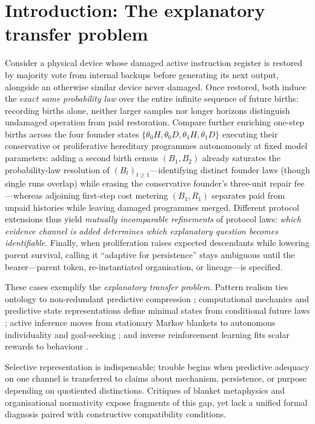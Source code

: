 \documentclass[12pt,letterpaper]{article}
\begin{document}
\section{Introduction: The explanatory transfer
problem}\label{introduction-the-explanatory-transfer-problem}

Consider a physical device whose damaged active instruction register is
restored by majority vote from internal backups before generating its
next output, alongside an otherwise similar device never damaged. Once
restored, both induce the \emph{exact same probability law} over the
entire infinite sequence of future births: recording births alone,
neither larger samples nor longer horizons distinguish undamaged
operation from paid restoration. Compare further enriching one-step
births across the four founder states
\(\{\theta_0 H, \theta_0 D, \theta_1 H, \theta_1 D\}\) executing their
conservative or proliferative hereditary programmes autonomously at
fixed model parameters: adding a second birth census \((B_1, B_2)\)
already saturates the probability-law resolution of
\((B_t)_{t\ge 1}\)---identifying distinct founder laws (though single
runs overlap) while erasing the conservative founder's three-unit repair
fee---whereas adjoining first-step cost metering \((B_1, R_1)\)
separates paid from unpaid histories while leaving damaged programmes
merged. Different protocol extensions thus yield \emph{mutually
incomparable refinements} of protocol laws: \emph{which evidence channel
is added determines which explanatory question becomes identifiable}.
Finally, when proliferation raises expected descendants while lowering
parent survival, calling it ``adaptive for persistence'' stays ambiguous
until the bearer---parent token, re-instantiated organisation, or
lineage---is specified.

These cases exemplify the \emph{explanatory transfer problem}. Pattern
realism ties ontology to non-redundant predictive compression
\citep{dennett1987, dennett1991, ladymanRoss2007, wimsatt2007};
computational mechanics and predictive state representations define
minimal states from conditional future laws
\citep{crutchfieldYoung1989, shaliziCrutchfield2001, littmanSuttonSingh2001, barnettCrutchfield2015};
active inference moves from stationary Markov blankets to autonomous
individuality and goal-seeking
\citep{friston2010, friston2013, clark2013, parrPezzuloFriston2022}; and
inverse reinforcement learning fits scalar rewards to behaviour
\citep{puterman1994, ngRussell2000}.

Selective representation is indispensable; trouble begins when
predictive adequacy on one channel is transferred to claims about
mechanism, persistence, or purpose depending on quotiented distinctions.
Critiques of blanket metaphysics \citep{raja2021, bruineberg2022} and
organisational normativity \citep{corti2023, bich2024, cuciniello2026}
expose fragments of this gap, yet lack a unified formal diagnosis paired
with constructive compatibility conditions.
\end{document}

